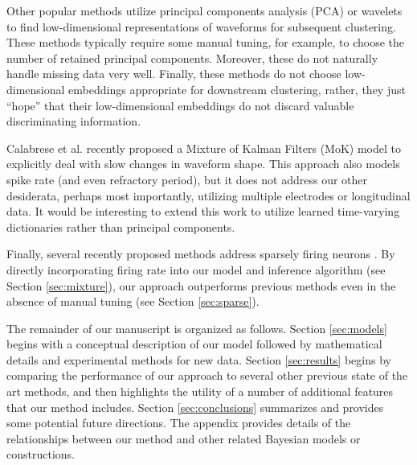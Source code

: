 \documentclass[journal]{IEEEtran}
\begin{document}
Other popular methods utilize principal components analysis (PCA) \cite{Lewicki} or wavelets \cite{Letelier2000} to find low-dimensional representations of waveforms for subsequent clustering.  These methods typically require some manual tuning, for example, to choose the number of retained principal components.  Moreover, these do not naturally handle missing data very well. Finally, these methods do not choose low-dimensional embeddings appropriate for downstream clustering, rather, they just ``hope'' that their low-dimensional embeddings do not discard valuable discriminating information. 


Calabrese et al. \cite{Calabrese2010} recently proposed a Mixture of Kalman Filters (MoK) model to explicitly deal with slow changes in waveform shape.  This approach also models spike rate (and even refractory period), but it does not address our other desiderata, perhaps most importantly, utilizing multiple electrodes or longitudinal data. It would be interesting to extend this work to utilize learned time-varying dictionaries rather than principal components.

Finally, several recently proposed methods address sparsely firing neurons \cite{Pedreira2012, Adamos2012}.  By directly incorporating firing rate into our model and inference algorithm (see Section \ref{sec:mixture}), our approach outperforms previous methods even in the absence of manual tuning (see Section \ref{sec:sparse}).

The remainder of our manuscript is organized as follows.  Section \ref{sec:models} begins with a conceptual description of our model followed by mathematical details and experimental methods for new data. Section \ref{sec:results} begins by comparing the performance of our approach to several other previous state of the art methods, and then highlights the utility of a number of additional features that our method includes.  Section \ref{sec:conclusions}  summarizes and provides some potential future directions.  The appendix provides details of the relationships between our method and other related Bayesian models or constructions.
\end{document}
